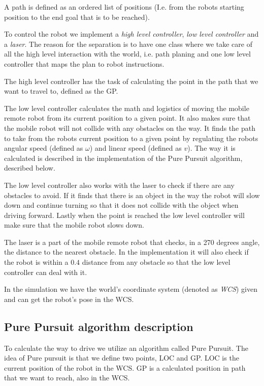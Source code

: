 \documentclass[12pt]{article}
\begin{document}
A path is defined as an ordered list of positions (I.e. from the robots starting
position to the end goal that is to be reached).

To control the robot we implement a \textit{high level controller}, 
\textit{low level controller} and a \textit{laser}. The reason for the separation is to have one class
where we take care of all the high level interaction with the world, i.e. path planing and one low
level controller that maps the plan to robot instructions.

The high level controller has the task of calculating the point in the path that
we want to travel to, defined as the GP. 

The low level controller calculates the math and logistics of moving the mobile
remote robot from its current position to a given point. It also makes sure
that the mobile robot will not collide with any obstacles on the way. It finds the
path to take from the robots current position to a given point by regulating the
robots angular speed (defined as $\omega$) and linear speed (defined as $v$).
The way it is calculated is described in the implementation of the Pure
Pursuit algorithm, described below.

The low level controller also works with the laser to check if there are any
obstacles to avoid. If it finds that there is an object in the way the
robot will slow down and continue turning so that it does not collide with the
object when driving forward. Lastly when the point is reached the low level
controller will make sure that the mobile robot slows down.  

The laser is a part of the mobile remote robot that checks, in a 270 degrees angle,
the distance to the nearest obstacle. In the implementation it will also check
if the robot is within a $0.4$ distance from any obstacle so that the low level
controller can deal with it.

In the simulation we have the world's coordinate system (denoted as
\textit{WCS}) given and can get the robot's pose in the WCS. 

\subsection{Pure Pursuit algorithm description}

To calculate the way to drive we utilize an algorithm called Pure Pursuit. The
idea of Pure pursuit is that we define two points, LOC and GP. LOC is the
current position of the robot in the WCS. GP is a calculated position in path
that we want to reach, also in the WCS. 
\end{document}
